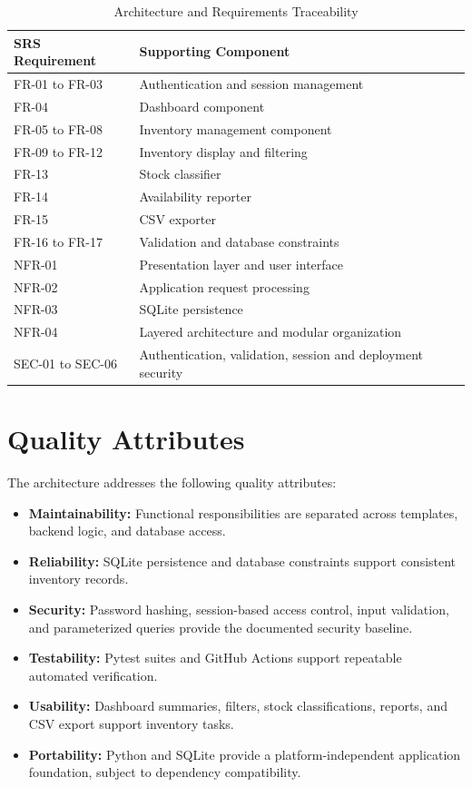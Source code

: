 \documentclass[conference]{IEEEtran}
\begin{document}
\begin{table}[!t]
\caption{Architecture and Requirements Traceability}
\label{tab:traceability}
\centering
\small
\begin{tabularx}{\columnwidth}{lY}
\toprule
\textbf{SRS Requirement} & \textbf{Supporting Component}\\
\midrule
FR-01 to FR-03 & Authentication and session management\\
FR-04 & Dashboard component\\
FR-05 to FR-08 & Inventory management component\\
FR-09 to FR-12 & Inventory display and filtering\\
FR-13 & Stock classifier\\
FR-14 & Availability reporter\\
FR-15 & CSV exporter\\
FR-16 to FR-17 & Validation and database constraints\\
NFR-01 & Presentation layer and user interface\\
NFR-02 & Application request processing\\
NFR-03 & SQLite persistence\\
NFR-04 & Layered architecture and modular organization\\
SEC-01 to SEC-06 & Authentication, validation, session and deployment security\\
\bottomrule
\end{tabularx}
\end{table}

\section{Quality Attributes}

The architecture addresses the following quality attributes:

\begin{itemize}
\item \textbf{Maintainability:} Functional responsibilities are separated across templates, backend logic, and database access.
\item \textbf{Reliability:} SQLite persistence and database constraints support consistent inventory records.
\item \textbf{Security:} Password hashing, session-based access control, input validation, and parameterized queries provide the documented security baseline.
\item \textbf{Testability:} Pytest suites and GitHub Actions support repeatable automated verification.
\item \textbf{Usability:} Dashboard summaries, filters, stock classifications, reports, and CSV export support inventory tasks.
\item \textbf{Portability:} Python and SQLite provide a platform-independent application foundation, subject to dependency compatibility.
\end{itemize}
\end{document}
